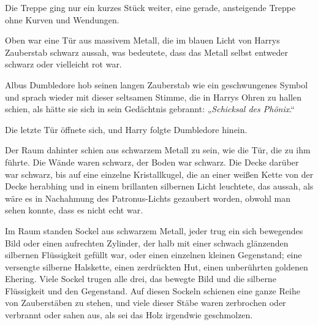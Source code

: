 Die Treppe ging nur ein kurzes Stück weiter, eine gerade, ansteigende Treppe ohne Kurven und Wendungen.

Oben war eine Tür aus massivem Metall, die im blauen Licht von Harrys Zauberstab schwarz aussah, was bedeutete, dass das Metall selbst entweder schwarz oder vielleicht rot war.

Albus Dumbledore hob seinen langen Zauberstab wie ein geschwungenes Symbol und sprach wieder mit dieser seltsamen Stimme, die in Harrys Ohren zu hallen schien, als hätte sie sich in sein Gedächtnis gebrannt: „\emph{Schicksal des Phönix}.“

Die letzte Tür öffnete sich, und Harry folgte Dumbledore hinein.

Der Raum dahinter schien aus schwarzem Metall zu sein, wie die Tür, die zu ihm führte. Die Wände waren schwarz, der Boden war schwarz. Die Decke darüber war schwarz, bis auf eine einzelne Kristallkugel, die an einer weißen Kette von der Decke herabhing und in einem brillanten silbernen Licht leuchtete, das aussah, als wäre es in Nachahmung des Patronus-Lichts gezaubert worden, obwohl man sehen konnte, dass es nicht echt war.

Im Raum standen Sockel aus schwarzem Metall, jeder trug ein sich bewegendes Bild oder einen aufrechten Zylinder, der halb mit einer schwach glänzenden silbernen Flüssigkeit gefüllt war, oder einen einzelnen kleinen Gegenstand; eine versengte silberne Halskette, einen zerdrückten Hut, einen unberührten goldenen Ehering. Viele Sockel trugen alle drei, das bewegte Bild und die silberne Flüssigkeit und den Gegenstand. Auf diesen Sockeln schienen eine ganze Reihe von Zauberstäben zu stehen, und viele dieser Stäbe waren zerbrochen oder verbrannt oder sahen aus, als sei das Holz irgendwie geschmolzen.

